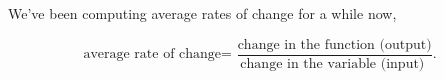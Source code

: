 \documentclass{ximera}
\begin{document}
We've been computing average rates of change for a while now, 

\[
{\text{average rate of change=
    }}
\frac{\text{change in the function (output)}}{\text{change in the variable (input) 
   }}.
\]
\begin{comment}
	 how exactly does one find the function that will give the
	instantaneous rate of change? Recall that the instantaneous rate of change
	of a line is the slope of the line.  Hence the instantaneous rate of
	change of a function is the slope of the tangent line. For now,
	consider the following informal definition of a \textit{tangent line}:
	\begin{quote}\index{tangent line}
	Given a function $f$ and a number $a$ in the domain of $f$, if one can ``zoom in''
	on the graph at $(a, f(a))$ sufficiently so that it appears to be a straight line,
	then that line is the \dfn{tangent line} to $f(x)$ at the point $(a,f(a))$.
	\end{quote}
	We illustrate this informal definition with the following diagram:
	\begin{image}
	\begin{tikzpicture}
	  \begin{axis}[
	            domain=0:6, range=0:7,
	            ymin=-.2,ymax=7,
	            width=6in,
	            height=2.5in, %
	            axis lines=none,
	          ]   
	          \addplot [draw=none, fill=textColor!10!background] plot coordinates {(.8,1.6) (2.834,5)} \closedcycle; %
	          \addplot [draw=none, fill=textColor!10!background] plot coordinates {(2.834,5) (4.166,5)} \closedcycle; %
	          \addplot [draw=none, fill=background] plot coordinates {(1.2,1.6) (4.166,5)} \closedcycle; %
	          \addplot [draw=none, fill=background] plot coordinates {(.8,1.6) (1.2,1.6)} \closedcycle; %
	
	          \addplot [draw=none, fill=textColor!10!background] plot coordinates {(3.3,3.6) (5.334,5)} \closedcycle; %
	          \addplot [draw=none, fill=textColor!10!background] plot coordinates {(5.334,5) (6.666,5)} \closedcycle; %
	          \addplot [draw=none, fill=background] plot coordinates {(3.7,3.6) (6.666,5)} \closedcycle; %
	          \addplot [draw=none, fill=background] plot coordinates {(3.3,3.6) (3.7,3.6)} \closedcycle; %
	          

\end{comment}
\end{document}
